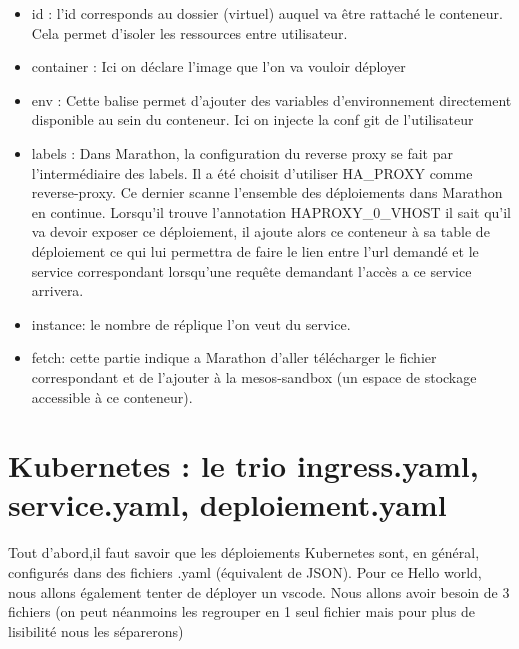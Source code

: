 \documentclass[11pt,fleqn]{book} %
\begin{document}
\begin{itemize}
    \item id : l'id corresponds au dossier (virtuel) auquel va être rattaché le conteneur. Cela permet d'isoler les ressources entre utilisateur.
    \item container : Ici on déclare l'image que l'on va vouloir déployer
    \item env : Cette balise permet d'ajouter des variables d'environnement directement disponible au sein du conteneur. Ici on injecte la conf git de l'utilisateur   
    \item labels : Dans Marathon, la configuration du reverse proxy se fait par l'intermédiaire des labels. Il a été choisit d'utiliser HA\_PROXY comme reverse-proxy. Ce dernier scanne l'ensemble des déploiements dans Marathon en continue. Lorsqu'il trouve l'annotation HAPROXY\_0\_VHOST il sait qu'il va devoir exposer ce déploiement, il ajoute alors ce conteneur à sa table de déploiement ce qui lui permettra de faire le lien entre l'url demandé et le service correspondant lorsqu'une requête demandant l'accès a ce service arrivera.   
    \item instance: le nombre de réplique l'on veut du service.
    \item fetch: cette partie indique a Marathon d'aller télécharger le fichier correspondant et de l'ajouter à la mesos-sandbox (un espace de stockage accessible à ce conteneur).
\end{itemize}
\section*{Kubernetes : le trio ingress.yaml, service.yaml, deploiement.yaml}

Tout d'abord,il faut savoir que les déploiements Kubernetes sont, en général, configurés dans des fichiers .yaml (équivalent de JSON). Pour ce Hello world, nous allons également tenter de déployer un vscode. Nous allons avoir besoin de 3 fichiers (on peut néanmoins les regrouper en 1 seul fichier mais pour plus de lisibilité nous les séparerons) 
\end{document}
